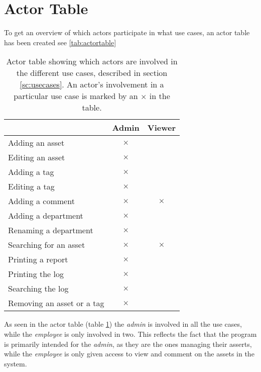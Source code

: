 \section{Actor Table}\label{sc:actortable}

To get an overview of which actors participate in what use cases, an actor table has been created see \autoref{tab:actortable}

\begin{table}[H]
    \centering
    \begin{tabular}{|l|c|c|}
        \hline
         & \textbf{Admin} & \textbf{Viewer}  \\
        \hline
        Adding an asset & $\pmb{\times}$ & \\
        \hline
        Editing an asset & $\pmb{\times}$ & \\
        \hline
        Adding a tag & $\pmb{\times}$ & \\
        \hline
        Editing a tag & $\pmb{\times}$ & \\
        \hline
        Adding a comment & $\pmb{\times}$ & $\pmb{\times}$ \\
        \hline
        Adding a department & $\pmb{\times}$ & \\
        \hline
        Renaming a department & $\pmb{\times}$ & \\
        \hline
        Searching for an asset & $\pmb{\times}$ & $\pmb{\times}$ \\
        \hline
        Printing a report & $\pmb{\times}$ & \\
        \hline
        Printing the log & $\pmb{\times}$ & \\
        \hline
        Searching the log & $\pmb{\times}$ & \\
        \hline
        Removing an asset or a tag & $\pmb{\times}$ & \\
        \hline
        
    \end{tabular}
    \caption{Actor table showing which actors are involved in the different use cases, described in section \ref{sc:usecases}. An actor's involvement in a particular use case is marked by an $\pmb{\times}$ in the table.}
    \label{tab:actortable}
\end{table}

As seen in the actor table (table \ref{tab:actortable}) the \textit{admin} is involved in all the use cases, while the \textit{employee} is only involved in two. This reflects the fact that the program is primarily intended for the \textit{admin}, as they are the ones managing their asserts, while the \textit{employee} is only given access to view and comment on the assets in the system. 

